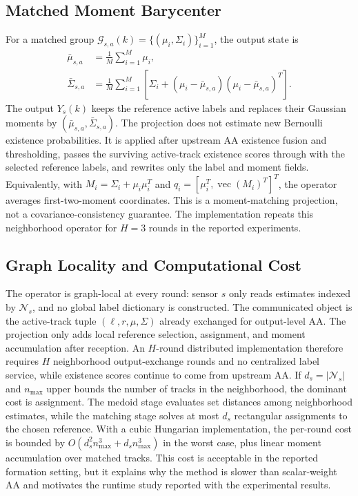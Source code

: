 \documentclass{IEEEtaes}
\begin{document}
\subsection{Matched Moment Barycenter}
For a matched group $\mathcal{G}_{s,a}(k)=\{(\mu_i,\Sigma_i)\}_{i=1}^{M}$, the output state is
\begin{align}
  \bar{\mu}_{s,a} &= \frac{1}{M}\sum_{i=1}^{M}\mu_i,\\
  \bar{\Sigma}_{s,a} &= \frac{1}{M}\sum_{i=1}^{M}
  \left[\Sigma_i+(\mu_i-\bar{\mu}_{s,a})(\mu_i-\bar{\mu}_{s,a})^T\right].
\end{align}
The output $Y_s(k)$ keeps the reference active labels and replaces their Gaussian moments by $(\bar{\mu}_{s,a},\bar{\Sigma}_{s,a})$. The projection does not estimate new Bernoulli existence probabilities. It is applied after upstream AA existence fusion and thresholding, passes the surviving active-track existence scores through with the selected reference labels, and rewrites only the label and moment fields. Equivalently, with $M_i=\Sigma_i+\mu_i\mu_i^T$ and $q_i=[\mu_i^T,\operatorname{vec}(M_i)^T]^T$, the operator averages first-two-moment coordinates. This is a moment-matching projection, not a covariance-consistency guarantee. The implementation repeats this neighborhood operator for $H=3$ rounds in the reported experiments.

\subsection{Graph Locality and Computational Cost}
The operator is graph-local at every round: sensor $s$ only reads estimates indexed by $\mathcal{N}_s$, and no global label dictionary is constructed. The communicated object is the active-track tuple $(\ell,r,\mu,\Sigma)$ already exchanged for output-level AA. The projection only adds local reference selection, assignment, and moment accumulation after reception. An $H$-round distributed implementation therefore requires $H$ neighborhood output-exchange rounds and no centralized label service, while existence scores continue to come from upstream AA. If $d_s=|\mathcal{N}_s|$ and $n_{\max}$ upper bounds the number of tracks in the neighborhood, the dominant cost is assignment. The medoid stage evaluates set distances among neighborhood estimates, while the matching stage solves at most $d_s$ rectangular assignments to the chosen reference. With a cubic Hungarian implementation, the per-round cost is bounded by $O(d_s^2 n_{\max}^3+d_s n_{\max}^3)$ in the worst case, plus linear moment accumulation over matched tracks. This cost is acceptable in the reported formation setting, but it explains why the method is slower than scalar-weight AA and motivates the runtime study reported with the experimental results.
\end{document}
